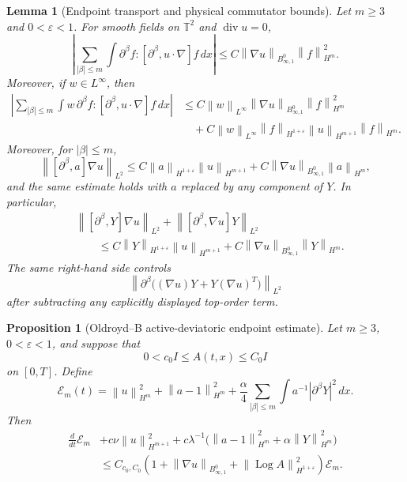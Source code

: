 \documentclass[10pt,a4paper]{amsart}
\newtheorem{lemma}{Lemma}
\newtheorem{proposition}{Proposition}
\newcommand{\Besov}{B^0_{\infty,1}}
\newcommand{\Log}{\operatorname{Log}}
\newcommand{\T}{\mathbb T}
\newcommand{\calE}{\mathcal E}
\newcommand{\divv}{\operatorname{div}}
\newcommand{\eps}{\varepsilon}
\newcommand{\norm}[1]{\left\lVert #1\right\rVert}
\begin{document}
\begin{lemma}[Endpoint transport and physical commutator bounds]
\label{lem:physical-commutator}
Let \(m\ge3\) and \(0<\eps<1\).  For smooth fields on \(\T^2\) and
\(\divv u=0\),
\[
  \left|
  \sum_{|\beta|\le m}
  \int \partial^\beta f:
  [\partial^\beta,u\cdot\nabla]f\,dx
  \right|
  \le C\norm{\nabla u}_{\Besov}\norm{f}_{H^m}^2.
  \label{eq:pointwise-transport-commutator}
\]
Moreover, if \(w\in L^\infty\), then
\[
\begin{aligned}
  \left|
  \sum_{|\beta|\le m}
  \int w\,\partial^\beta f:
  [\partial^\beta,u\cdot\nabla]f\,dx
  \right|
  &\le C\norm{w}_{L^\infty}
  \norm{\nabla u}_{\Besov}\norm{f}_{H^m}^2 \\
  &\quad
  +C\norm{w}_{L^\infty}\norm{f}_{H^{1+\eps}}
    \norm{u}_{H^{m+1}}\norm{f}_{H^m}.
\end{aligned}
  \label{eq:weighted-transport-commutator}
\]
Moreover, for \(|\beta|\le m\),
\[
  \norm{[\partial^\beta,a]\nabla u}_{L^2}
  \le C\norm{a}_{H^{1+\eps}}\norm{u}_{H^{m+1}}
       +C\norm{\nabla u}_{\Besov}\norm{a}_{H^m},
  \label{eq:kp-a-u}
\]
and the same estimate holds with \(a\) replaced by any component of \(Y\).  In
particular,
\[
\begin{aligned}
  &\norm{[\partial^\beta,Y]\nabla u}_{L^2}
  +\norm{[\partial^\beta,\nabla u]Y}_{L^2}  \\
  &\qquad\le
  C\norm{Y}_{H^{1+\eps}}\norm{u}_{H^{m+1}}
  +C\norm{\nabla u}_{\Besov}\norm{Y}_{H^m} .
\end{aligned}
  \label{eq:kp-Y-u}
\]
The same right-hand side controls
\[
  \norm{\partial^\beta\bigl((\nabla u)Y+Y(\nabla u)^T\bigr)}_{L^2}
\]
after subtracting any explicitly displayed top-order term.
\end{lemma}

\begin{proposition}[Oldroyd--B active-deviatoric endpoint estimate]
\label{prop:physical-L2-estimate}
Let \(m\ge3\), \(0<\eps<1\), and suppose that
\[
  0<c_0I\le A(t,x)\le C_0I
\]
on \([0,T]\).  Define
\[
  \calE_m(t)=\norm{u}_{H^m}^2+\norm{a-1}_{H^m}^2
  +\frac{\alpha}{4}\sum_{|\beta|\le m}\int a^{-1}|\partial^\beta Y|^2\,dx .
\]
Then
\[
\begin{aligned}
  \frac{d}{dt}\calE_m
  &+c\nu\norm{u}_{H^{m+1}}^2
   +c\lambda^{-1}\bigl(\norm{a-1}_{H^m}^2+\alpha\norm{Y}_{H^m}^2\bigr) \\
  &\le
  C_{c_0,C_0}\left(1+\norm{\nabla u}_{\Besov}
  +\norm{\Log A}_{H^{1+\eps}}^2\right)\calE_m .
\end{aligned}
\label{eq:physical-L2-energy}
\]
\end{proposition}
\end{document}
